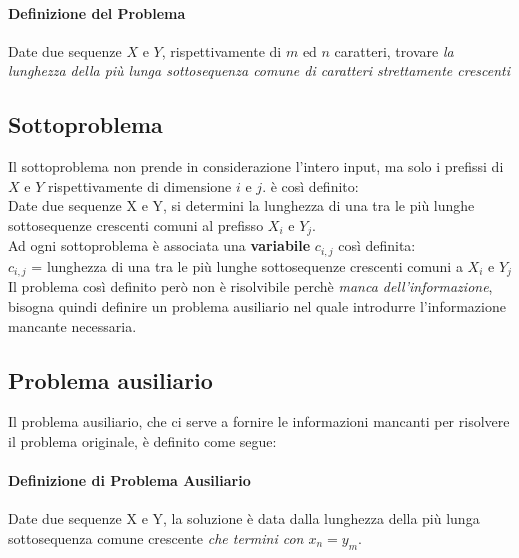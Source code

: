 \documentclass[12pt, a4paper, openany]{book}
\begin{document}
\paragraph*{Definizione del Problema}
Date due sequenze $X$ e $Y$, rispettivamente di $m$ ed $n$ caratteri, trovare \emph{la lunghezza della più lunga sottosequenza comune di caratteri strettamente crescenti}

\subsection*{Sottoproblema}
Il sottoproblema non prende in considerazione l'intero input, ma solo i prefissi di $X$ e $Y$ rispettivamente di dimensione $i$ e $j$.
è così definito:
\\Date due sequenze X e Y, si determini la lunghezza di una tra le più lunghe sottosequenze crescenti comuni al prefisso $X_i$ e $Y_j$.
\\Ad ogni sottoproblema è associata una \textbf{variabile} $c_{i,j}$ così definita:
\\$c_{i,j}$ = lunghezza di una tra le più lunghe sottosequenze crescenti comuni a $X_i$ e $Y_j$
\\Il problema così definito però non è risolvibile perchè \emph{manca dell'informazione}, bisogna quindi definire un problema ausiliario nel quale introdurre l'informazione mancante necessaria.

\subsection*{Problema ausiliario}
Il problema ausiliario, che ci serve a fornire le informazioni mancanti per risolvere il problema originale, è definito come segue:

\paragraph*{Definizione di Problema Ausiliario}
Date due sequenze X e Y, la soluzione è data dalla lunghezza della più lunga sottosequenza comune crescente \emph{che termini con $x_n =y_m$}.

\end{document}
